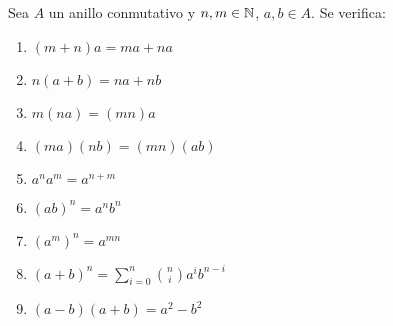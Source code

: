 \begin{prop}\label{prop:2.13}
    Sea $A$ un anillo conmutativo y $n, m \in \mathbb N$, $a,b \in A$. Se verifica:
    \begin{enumerate}
        \item $(m+n)a = ma + na$
        \item $n(a+b) = na+nb$
        \item $m(na) = (mn)a$
        \item $(ma)(nb) = (mn)(ab)$
        \item $a^na^m = a^{n+m}$
        \item $(ab)^n = a^nb^n$
        \item $(a^m)^n = a^{mn}$
        \item $(a+b)^n = \sum\limits_{i=0}^n \binom{n}{i} a^i b^{n-i}$
        \item $(a-b) (a+b) = a^2-b^2$
    \end{enumerate}
\end{prop}
